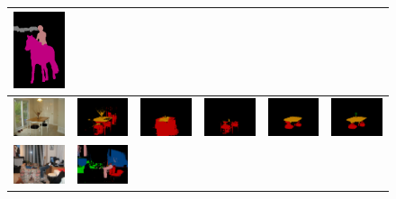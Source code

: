 \begin{figure}[!htbp]
{\begin{tabular}{c c c c c c}
    \includegraphics[height=0.15\linewidth]{fig/val_crf_vis/cocomix/2007_005331.png} \\
\hline \hline
    \includegraphics[height=0.11\linewidth]{fig/val_crf_vis/img/2007_000830.jpg} &
    \includegraphics[height=0.11\linewidth]{fig/val_crf_vis/adaweak/2007_000830.png} &
    \includegraphics[height=0.11\linewidth]{fig/val_crf_vis/bbox/2007_000830.png} &
    \includegraphics[height=0.11\linewidth]{fig/val_crf_vis/bbox_crf/2007_000830.png} &
    \includegraphics[height=0.11\linewidth]{fig/val_crf_vis/strongweak/2007_000830.png} &
    \includegraphics[height=0.11\linewidth]{fig/val_crf_vis/cocomix/2007_000830.png} \\
    \includegraphics[height=0.11\linewidth]{fig/val_crf_vis/img/2007_001175.jpg} &
    \includegraphics[height=0.11\linewidth]{fig/val_crf_vis/adaweak/2007_001175.png} &

\end{tabular}}
\end{figure}
